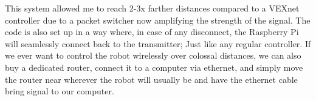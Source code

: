 This system allowed me to reach 2-3x farther distances compared to a VEXnet controller due to a packet switcher now amplifying the strength of the signal. The code is also set up in a way where, in case of any disconnect, the Raspberry Pi will seamlessly connect back to the transmitter; Just like any regular controller. If we ever want to control the robot wirelessly over colossal distances, we can also buy a dedicated router, connect it to a computer via ethernet, and simply move the router near wherever the robot will usually be and have the ethernet cable bring signal to our computer.


